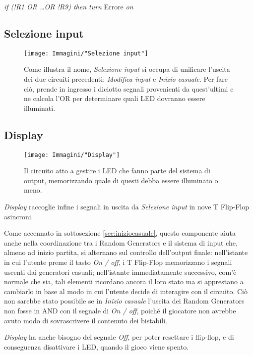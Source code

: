 \documentclass[11pt]{article}
\begin{document}
{\itshape if (!R1 OR \dots OR !R9) then turn} Errore {\itshape on}


\subsection{Selezione input}

\begin{figure}[H]
\centering
\texttt{[image: Immagini/"Selezione input"]}
\caption{{\small Come illustra il nome, {\itshape Selezione input} si occupa di unificare l'uscita dei due circuiti precedenti: {\itshape Modifica input} e {\itshape Inizio casuale}.
Per fare ciò, prende in ingresso i diciotto segnali provenienti da quest'ultimi e ne calcola l'OR per determinare quali LED dovranno essere illuminati.}}
\label{fig:selezioneinput}
\end{figure}

\subsection{Display}

\begin{figure}[H]
\centering
\texttt{[image: Immagini/"Display"]}
\caption{{\small Il circuito atto a gestire i LED che fanno parte del sistema di output, memorizzando quale di questi debba essere illuminato o meno.}}
\label{fig:display}
\end{figure}

{\itshape Display} raccoglie infine i segnali in uscita da {\itshape Selezione input} in nove T Flip-Flop asincroni.

Come accennato in sottosezione \underline{\vref{sec:iniziocasuale}}, questo componente aiuta anche nella coordinazione tra i Random Generators e il sistema di input che, almeno ad inizio partita, si alternano sul controllo dell'output finale: nell'istante in cui l'utente preme il tasto {\itshape On / off}, i T Flip-Flop memorizzano i segnali uscenti dai generatori casuali; nell'istante immediatamente successivo, com'è normale che sia, tali elementi ricordano ancora il loro stato ma si apprestano a cambiarlo in base al modo in cui l'utente decide di interagire con il circuito. Ciò non sarebbe stato possibile se in {\itshape Inizio casuale} l'uscita dei Random Generators non fosse in AND con il segnale di {\itshape On / off}, poiché il giocatore non avrebbe avuto modo di sovrascrivere il contenuto dei bistabili.

{\itshape Display} ha anche bisogno del segnale {	\itshape Off}, per poter resettare i flip-flop, e di conseguenza disattivare i LED, quando il gioco viene spento.
\end{document}
